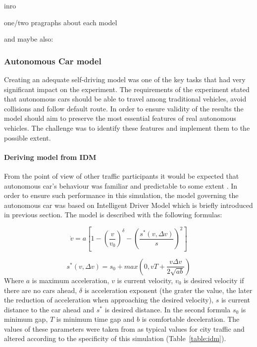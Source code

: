 \documentclass[11pt,english]{article}
\begin{document}
inro


one/two pragraphs about each model


\citep{treiber2013traffic}

and maybe also:

\citep{rothery1992car}


\subsubsection{Autonomous Car model}


Creating an adequate self-driving model was one of the key tasks that had very significant impact on the experiment. The requirements of the experiment stated that autonomous cars should be able to travel among traditional vehicles, avoid collisions and follow default route. In order to ensure validity of the results the model should aim to preserve the most essential features of real autonomous vehicles. The challenge was to identify these features and implement them to the possible extent. 

\paragraph{Deriving model from IDM}%
From the point of view of other traffic participants it would be expected that autonomous car's behaviour was familiar and predictable to some extent \citep{sivak2015road}. In order to ensure such performance in this simulation, the model governing the autonomous car was based on Intelligent Driver Model which is briefly introduced in previous section. The model is described with the following formulas:



\begin{equation}
\dot{v}=a\left[1-\left(\frac{v}{v_0}\right)^{\delta}-\left(\frac{s^{*}\left ( v,\Delta v \right )}{s}\right)^{2}\right]
\end{equation}

\begin{equation}
s^{*}\left ( v,\Delta v \right )=s_0+max\left ( 0,vT+\frac{v\Delta v}{2 \sqrt{ab}} \right )
\end{equation}
Where $a$ is maximum acceleration, $v$ is current velocity, $v_0$ is desired velocity if there are no cars ahead, $\delta$ is acceleration exponent (the grater the value, the later the reduction of acceleration when approaching  the desired velocity), $s$ is current distance to the car ahead and  $s^{*}$ is desired distance.
In the second formula $s_0$ is minimum gap, $T$ is minimum time gap and $b$ is comfortable deceleration. The values of these parameters were taken from \citet{sivak2015road} as typical values for city traffic and altered according to the specificity of this simulation (Table~\ref{table:idm}).
\end{document}
